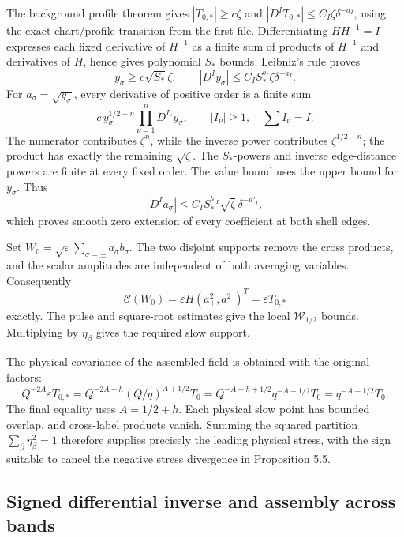 \documentclass[10pt,a4paper]{article}
\begin{document}
The background profile theorem gives \(|T_{0,*}|\ge c\zeta\) and \(|D^IT_{0,*}|\le C_I\zeta\delta^{-a_I}\), using the exact chart/profile transition from the first file. Differentiating \(HH^{-1}=I\) expresses each fixed derivative of \(H^{-1}\) as a finite sum of products of \(H^{-1}\) and derivatives of \(H\), hence gives polynomial \(S_*\) bounds. Leibniz's rule proves \[
y_\sigma\ge c\sqrt{S_*}\zeta,\qquad
|D^Iy_\sigma|\le C_IS_*^{b_I}\zeta\delta^{-a_I}.
\] For \(a_\sigma=\sqrt{y_\sigma}\), every derivative of positive order is a finite sum \[
c\,y_\sigma^{1/2-n}\prod_{\nu=1}^nD^{I_\nu}y_\sigma,
\qquad |I_\nu|\ge1,\quad \sum I_\nu=I.
\] The numerator contributes \(\zeta^n\), while the inverse power contributes \(\zeta^{1/2-n}\); the product has exactly the remaining \(\sqrt\zeta\). The \(S_*\)-powers and inverse edge-distance powers are finite at every fixed order. The value bound uses the upper bound for \(y_\sigma\). Thus \[
|D^Ia_\sigma|\le C_IS_*^{b'_I}\sqrt\zeta\,\delta^{-a'_I},
\] which proves smooth zero extension of every coefficient at both shell edges.

Set \(W_0=\sqrt\varepsilon\sum_{\sigma=\pm}a_\sigma b_\sigma\). The two disjoint supports remove the cross products, and the scalar amplitudes are independent of both averaging variables. Consequently \[
\mathcal C(W_0)=\varepsilon H(a_+^2,a_-^2)^T
=\varepsilon T_{0,*}
\] exactly. The pulse and square-root estimates give the local \(\mathcal W_{1/2}\) bounds. Multiplying by \(\eta_\beta\) gives the required slow support.

The physical covariance of the assembled field is obtained with the original factors: \[
Q^{-2A}\varepsilon T_{0,*}
=Q^{-2A+h}(Q/q)^{A+1/2}T_0
=Q^{-A+h+1/2}q^{-A-1/2}T_0
=q^{-A-1/2}T_0.
\] The final equality uses \(A=1/2+h\). Each physical slow point has bounded overlap, and cross-label products vanish. Summing the squared partition \(\sum_\beta\eta_\beta^2=1\) therefore supplies precisely the leading physical stress, with the sign suitable to cancel the negative stress divergence in Proposition 5.5.

\subsection{Signed differential inverse and assembly across bands}\label{signed-differential-inverse-and-assembly-across-bands}
\end{document}
